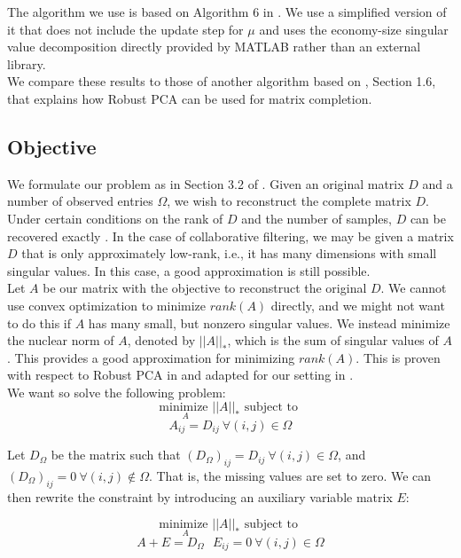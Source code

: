 \documentclass[10pt,conference,compsocconf]{IEEEtran}
\begin{document}
The algorithm we use is based on Algorithm 6 in \cite{almpaper}.
We use a simplified version of it that does not include the update step
for $\mu$ and uses the economy-size singular value decomposition directly
provided by MATLAB rather than an external library. \\

We compare these results to those of another algorithm based on \cite{rpcapaper},
Section 1.6, that explains how Robust PCA can be used for matrix completion. \\

\subsection{Objective}

We formulate our problem as in Section 3.2 of \cite{almpaper}. Given an original matrix $D$ and
a number of observed entries $\Omega$, we wish to reconstruct the complete matrix $D$. Under certain
conditions on the rank of $D$ and the number of samples, $D$ can be recovered exactly \cite{exactpaper}. 
In the case of collaborative filtering, we may be given a matrix $D$ that is only
approximately low-rank, i.e., it has many dimensions with small singular values. In this case, a good approximation
is still possible. \\

Let $A$ be our matrix with the objective to reconstruct the original $D$. We cannot use convex optimization to minimize $rank(A)$ directly, and we might not want to do this if $A$ has many small, but nonzero singular values. We instead minimize the nuclear norm of $A$, denoted by $||A||_*$, which is the sum of singular values of $A$. This provides a good approximation for minimizing $rank(A)$. This is proven with respect to Robust PCA in \cite{rpcapaper} and adapted for our setting in \cite{almpaper}. \\

We want so solve the following problem: 
$$ \underset{A}{\text{minimize }} ||A||_* \text{ subject to  }$$
$$A_{ij} = D_{ij} \ \forall(i, j) \in \Omega$$

Let $D_{\Omega}$ be the matrix such that $(D_{\Omega})_{ij} = D_{ij} \ \forall(i, j) \in \Omega$, and $(D_{\Omega})_{ij} = 0 \ \forall(i, j) \notin \Omega$. That is, the missing values are set to zero. We can then rewrite the constraint by introducing an auxiliary variable matrix $E$:

$$ \underset{A}{\text{minimize }} ||A||_* \text{ subject to  }$$ 
$$A + E = D_{\Omega} \ \ \ E_{ij} = 0 \ \forall(i, j) \in \Omega$$
\end{document}
